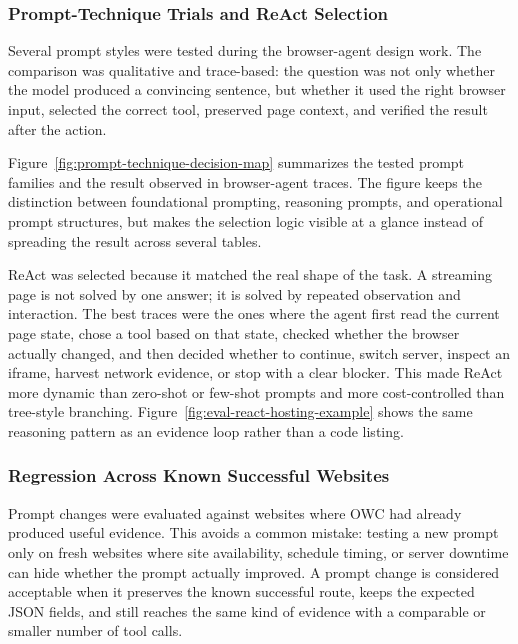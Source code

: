 \subsubsection{Prompt-Technique Trials and ReAct Selection}

Several prompt styles were tested during the browser-agent design work. The comparison
was qualitative and trace-based: the question was not only whether the model produced a
convincing sentence, but whether it used the right browser input, selected the correct
tool, preserved page context, and verified the result after the action.

Figure~\ref{fig:prompt-technique-decision-map} summarizes the tested prompt families and
the result observed in browser-agent traces. The figure keeps the distinction between
foundational prompting, reasoning prompts, and operational prompt structures, but makes
the selection logic visible at a glance instead of spreading the result across several
tables.



ReAct was selected because it matched the real shape of the task. A streaming page is
not solved by one answer; it is solved by repeated observation and interaction. The
best traces were the ones where the agent first read the current page state, chose a
tool based on that state, checked whether the browser actually changed, and then decided
whether to continue, switch server, inspect an iframe, harvest network evidence, or stop
with a clear blocker. This made ReAct more dynamic than zero-shot or few-shot prompts
and more cost-controlled than tree-style branching. Figure~\ref{fig:eval-react-hosting-example}
shows the same reasoning pattern as an evidence loop rather than a code listing.

\FloatBarrier
\clearpage


\subsubsection{Regression Across Known Successful Websites}

Prompt changes were evaluated against websites where OWC had already produced useful
evidence. This avoids a common mistake: testing a new prompt only on fresh websites where
site availability, schedule timing, or server downtime can hide whether the prompt
actually improved. A prompt change is considered acceptable when it preserves the known
successful route, keeps the expected JSON fields, and still reaches the same kind of
evidence with a comparable or smaller number of tool calls.

